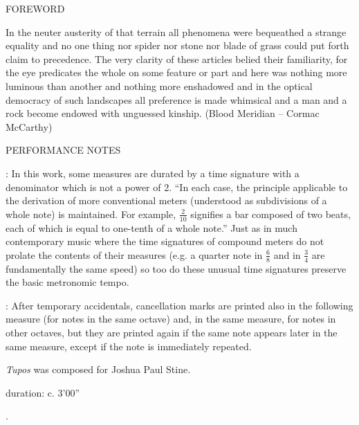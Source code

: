 \documentclass[11pt]{article}
\begin{document}
\begin{center}
\huge FOREWORD
\end{center}

\begingroup

\begin{center}
In the neuter austerity of that terrain all phenomena were bequeathed a strange equality and no one thing nor spider nor stone nor blade of grass could put forth claim to precedence. The very clarity of these articles belied their familiarity, for the eye predicates the whole on some feature or part and here was nothing more luminous than another and nothing more enshadowed and in the optical democracy of such landscapes all preference is made whimsical and a man and a rock become endowed with unguessed kinship.
\rightskip\leftskip
\phantom{text} \hfill (Blood Meridian -- Cormac McCarthy)
\end{center}

\endgroup


\begin{center}
\huge PERFORMANCE NOTES
\end{center}

 : In this work, some measures are durated by a time signature with a denominator which is not a power of 2. ``In each case, the principle applicable to the derivation of more conventional meters (understood as subdivisions of a whole note) is maintained. For example, $\frac{2}{10}$ signifies a bar composed of two beats, each of which is equal to one-tenth of a whole note.'' Just as in much contemporary music where the time signatures of compound meters do not prolate the contents of their measures (e.g. a quarter note in $\frac{6}{8}$ and in $\frac{3}{4}$ are fundamentally the same speed) so too do these unusual time signatures preserve the basic metronomic tempo. \\
\rightskip\leftskip
\phantom{text} \hfill \phantom{()}

\vspace*{0.25cm}


 : After temporary accidentals, cancellation marks are printed also in the following measure (for notes in the same octave) and, in the same measure, for notes in other octaves, but they are printed again if the same note appears later in the same measure, except if the note is immediately repeated. \\
\rightskip\leftskip
\phantom{text} \hfill \phantom{()}

\vspace*{20\baselineskip}

\begin{center}
\textit{Tupos} was composed for Joshua Paul Stine.
\end{center}

\vspace*{15\baselineskip}

\begin{center}
duration: c. 3'00''
\end{center}

.
\end{document}
